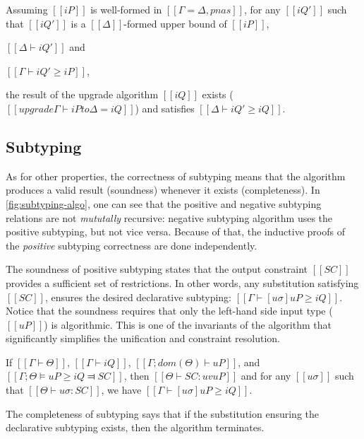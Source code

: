     \begin{lemma*}
        Assuming $[[iP]]$ is well-formed in $[[Γ = Δ, pnas]]$,
        for any $[[iQ']]$ such that $[[iQ']]$ is a $[[Δ]]$-formed upper bound of $[[iP]]$, \ie
        \begin{enumerate*}
            \item $[[Δ ⊢ iQ']]$ and
            \item $[[Γ ⊢ iQ' ≥ iP]]$,
        \end{enumerate*}
        the result of the upgrade algorithm $[[iQ]]$ exists
        ($[[upgrade Γ ⊢ iP to Δ = iQ]]$) and satisfies $[[Δ ⊢ iQ' ≥ iQ]]$.
    \end{lemma*}

\subsection{Subtyping}

    As for other properties, the correctness of subtyping means that
    the algorithm produces a valid result (soundness) 
    whenever it exists (completeness).
    In \cref{fig:subtyping-algo}, one can see that the positive and 
    negative subtyping relations are not \emph{mututally} recursive: 
    negative subtyping algorithm uses the positive subtyping, 
    but not vice versa. 
    Because of that, the inductive proofs of the \emph{positive} subtyping correctness are done independently.

    The soundness of positive subtyping states that
    the output constraint $[[SC]]$ provides a sufficient set of restrictions.
    In other words, any substitution satisfying $[[SC]]$, 
    ensures the desired declarative subtyping: $[[Γ ⊢ [uσ]uP ≥ iQ]]$.
    Notice that the soundness requires that only the left-hand side input 
    type ($[[uP]]$) is algorithmic. This is one of the invariants of the algorithm
    that significantly simplifies the unification and constraint resolution.

\begin{lemma*}
    If $[[Γ ⊢ Θ]]$, $[[Γ ⊢ iQ]]$, $[[Γ ; dom(Θ) ⊢  uP]]$, and 
    $[[Γ ; Θ ⊨ uP ≥ iQ ⫤ SC]]$,
    then $[[Θ ⊢ SC : uv uP]]$ and
    for any  $[[uσ]]$ such that $[[ Θ ⊢ uσ : SC ]]$,
    we have $[[ Γ ⊢ [uσ]uP ≥ iQ ]]$.
\end{lemma*}

    The completeness of subtyping says that if the substitution 
    ensuring the declarative subtyping exists, then the algorithm terminates.

